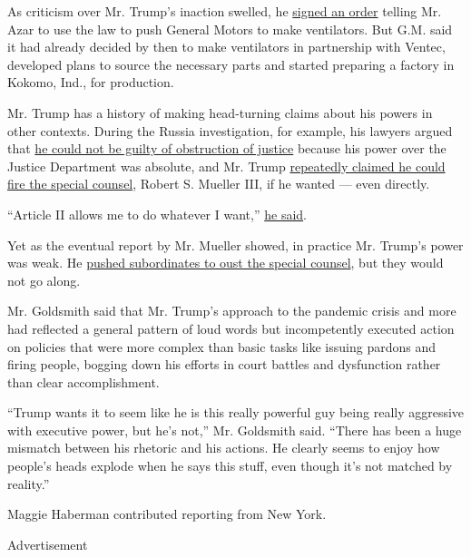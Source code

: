 As criticism over Mr. Trump's inaction swelled, he
\href{https://www.whitehouse.gov/presidential-actions/memorandum-order-defense-production-act-regarding-general-motors-company/}{signed
an order} telling Mr. Azar to use the law to push General Motors to make
ventilators. But G.M. said it had already decided by then to make
ventilators in partnership with Ventec, developed plans to source the
necessary parts and started preparing a factory in Kokomo, Ind., for
production.

Mr. Trump has a history of making head-turning claims about his powers
in other contexts. During the Russia investigation, for example, his
lawyers argued that
\href{https://www.nytimes3xbfgragh.onion/2017/12/04/us/politics/obstruction-of-justice-trump-explained.html}{he
could not be guilty of obstruction of justice} because his power over
the Justice Department was absolute, and Mr. Trump
\href{https://www.nytimes3xbfgragh.onion/2018/04/10/us/politics/trump-firing-authority-mueller.html}{repeatedly
claimed he could fire the special counsel}, Robert S. Mueller III, if he
wanted --- even directly.

``Article II allows me to do whatever I want,''
\href{https://abcnews.go.com/Politics/transcript-abc-news-george-stephanopoulos-exclusive-interview-president/story?id=63749144}{he
said}.

Yet as the eventual report by Mr. Mueller showed, in practice Mr.
Trump's power was weak. He
\href{https://www.nytimes3xbfgragh.onion/2019/04/23/us/politics/trump-mueller-obstruction.html}{pushed
subordinates to oust the special counsel}, but they would not go along.

Mr. Goldsmith said that Mr. Trump's approach to the pandemic crisis and
more had reflected a general pattern of loud words but incompetently
executed action on policies that were more complex than basic tasks like
issuing pardons and firing people, bogging down his efforts in court
battles and dysfunction rather than clear accomplishment.

``Trump wants it to seem like he is this really powerful guy being
really aggressive with executive power, but he's not,'' Mr. Goldsmith
said. ``There has been a huge mismatch between his rhetoric and his
actions. He clearly seems to enjoy how people's heads explode when he
says this stuff, even though it's not matched by reality.''

Maggie Haberman contributed reporting from New York.

Advertisement

